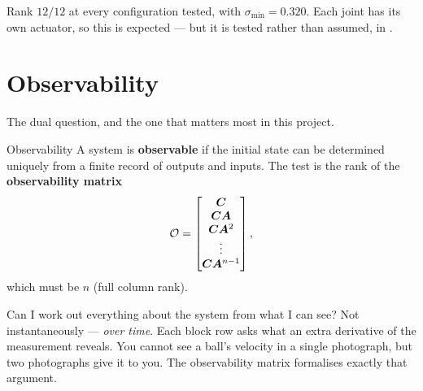 \begin{inproject}
Rank $12/12$ at every configuration tested, with $\sigma_{\min} = 0.320$. Each joint has its own actuator,
so this is expected --- but it is tested rather than assumed, in
.
\end{inproject}

\section{Observability}

The dual question, and the one that matters most in this project.

\begin{definition}{Observability}
A system is \textbf{observable} if the initial state can be determined uniquely from a finite record of
outputs and inputs. The test is the rank of the \textbf{observability matrix}
\[
\mathcal{O} = \begin{bmatrix}\bm{C} \\ \bm{C}\bm{A} \\ \bm{C}\bm{A}^2 \\ \vdots \\ \bm{C}\bm{A}^{n-1}\end{bmatrix},
\]
which must be $n$ (full column rank).
\end{definition}

\begin{intuition}
Can I work out everything about the system from what I can see? Not instantaneously --- \emph{over time}.
Each block row asks what an extra derivative of the measurement reveals. You cannot see a ball's velocity
in a single photograph, but two photographs give it to you. The observability matrix formalises exactly
that argument.
\end{intuition}


